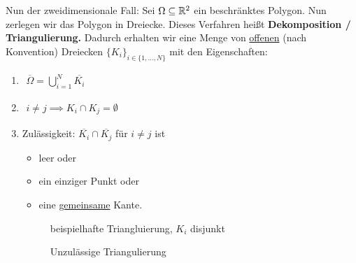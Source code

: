 Nun der zweidimensionale Fall: Sei $\Omega\subseteq\mathbb{R}^2$ ein beschränktes Polygon. Nun zerlegen wir das Polygon in Dreiecke. Dieses Verfahren heißt \textbf{Dekomposition / Triangulierung.} Dadurch erhalten wir eine Menge von \underline{offenen} (nach Konvention) Dreiecken $\lbrace K_i\rbrace_{i\in\lbrace1,\ldots,N\rbrace}$ mit den Eigenschaften:

\begin{enumerate}[label=(\roman*)]
	\item $\begin{aligned}
		\overline{\Omega}=\bigcup\limits_{i=1}^N \overline{K_i}
		\end{aligned}$ 
	\item $\begin{aligned}
		i\neq j\implies K_i\cap K_j=\emptyset
	\end{aligned}$
	\item Zulässigkeit: $\overline{K_i}\cap\overline{K_j}$ für $i\neq j$ ist
	\begin{itemize}
		\item leer oder
		\item ein einziger Punkt oder
		\item eine \ul{gemeinsame} Kante.
	\end{itemize}

	\begin{figure}[!ht]
		\begin{center}
			
			\caption{beispielhafte Triangluierung, $K_i$ disjunkt}
			\label{AbbTriangulierung}
		\end{center}
	\end{figure}

	\begin{figure}[!ht]
		\begin{center}
			
			\caption{Unzulässige Triangulierung}
			\label{AbbUnzulaessigeTriangulierung}
		\end{center}
	\end{figure}
\end{enumerate}

